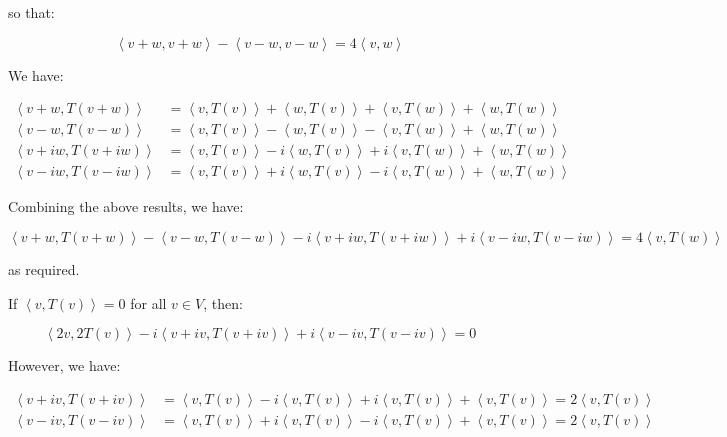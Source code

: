 \documentclass[12pt]{article}
\begin{document}
so that:

\begin{equation}
    \left\langle v + w, v + w \right\rangle - \left\langle v - w, v - w \right\rangle = 4 \left\langle v, w \right\rangle
\end{equation}

We have:

\begin{equation}
\begin{split}
    \left\langle v + w, T(v + w) \right\rangle &= \left\langle v, T(v) \right\rangle + \left\langle w, T(v) \right\rangle + \left\langle v, T(w) \right\rangle + \left\langle w, T(w) \right\rangle \\
    \left\langle v - w, T(v - w) \right\rangle &= \left\langle v, T(v) \right\rangle - \left\langle w, T(v) \right\rangle - \left\langle v, T(w) \right\rangle + \left\langle w, T(w) \right\rangle \\
    \left\langle v + iw, T(v + iw) \right\rangle &= \left\langle v, T(v) \right\rangle - i \left\langle w, T(v) \right\rangle + i \left\langle v, T(w) \right\rangle + \left\langle w, T(w) \right\rangle \\
    \left\langle v - iw, T(v - iw) \right\rangle &= \left\langle v, T(v) \right\rangle + i \left\langle w, T(v) \right\rangle - i \left\langle v, T(w) \right\rangle + \left\langle w, T(w) \right\rangle
\end{split}
\end{equation}

Combining the above results, we have:

\begin{equation}
    \left\langle v + w, T(v + w) \right\rangle - \left\langle v - w, T(v - w) \right\rangle - i \left\langle v + iw, T(v + iw) \right\rangle + i \left\langle v - iw, T(v - iw) \right\rangle = 4 \left\langle v, T(w) \right\rangle
\end{equation}

as required.

If $\left\langle v, T(v) \right\rangle = 0$ for all $v \in V$, then:

\begin{equation}
    \left\langle 2v, 2T(v) \right\rangle - i \left\langle v + iv, T(v + iv) \right\rangle + i \left\langle v - iv, T(v - iv) \right\rangle = 0
\end{equation}

However, we have:

\begin{equation}
\begin{split}
    \left\langle v + iv, T(v + iv) \right\rangle &= \left\langle v, T(v) \right\rangle - i \left\langle v, T(v) \right\rangle + i \left\langle v, T(v) \right\rangle + \left\langle v, T(v) \right\rangle = 2 \left\langle v, T(v) \right\rangle \\
    \left\langle v - iv, T(v - iv) \right\rangle &= \left\langle v, T(v) \right\rangle + i \left\langle v, T(v) \right\rangle - i \left\langle v, T(v) \right\rangle + \left\langle v, T(v) \right\rangle = 2 \left\langle v, T(v) \right\rangle
\end{split}
\end{equation}
\end{document}
